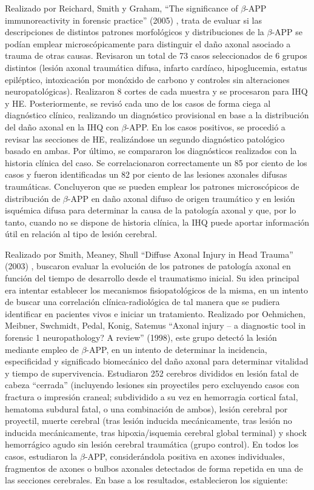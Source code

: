 Realizado por Reichard, Smith y Graham, “The significance of $\beta$-APP immunoreactivity in forensic practice” (2005) \cite{Reichard2005}, trata de evaluar si las descripciones de distintos patrones morfológicos y distribuciones de la $\beta$-APP se podían emplear microscópicamente para distinguir el daño axonal asociado a trauma de otras causas. Revisaron un total de 73 casos seleccionados de 6 grupos distintos (lesión axonal traumática difusa, infarto cardíaco, hipoglucemia, estatus epiléptico, intoxicación por monóxido de carbono y controles sin alteraciones neuropatológicas). Realizaron 8 cortes de cada muestra y se procesaron para IHQ y HE. Posteriormente, se revisó cada uno de los casos de forma ciega al diagnóstico clínico, realizando un diagnóstico provisional en base a la distribución del daño axonal en la IHQ con $\beta$-APP. En los casos positivos, se procedió a revisar las secciones de HE, realizándose un segundo diagnóstico patológico basado en ambas.  Por último, se compararon los diagnósticos realizados con la historia clínica del caso. Se correlacionaron correctamente un 85 por ciento de los casos y fueron identificadas un 82 por ciento de las lesiones axonales difusas traumáticas. Concluyeron que se pueden emplear los patrones microscópicos de distribución de $\beta$-APP en daño axonal difuso de origen traumático y en lesión isquémica difusa para determinar la causa de la patología axonal y que, por lo tanto, cuando no se dispone de historia clínica, la IHQ puede aportar información útil en relación al tipo de lesión cerebral. 

Realizado por Smith, Meaney, Shull “Diffuse Axonal Injury in Head Trauma” (2003) \cite{Smith2003}, buscaron evaluar la evolución de los patrones de patología axonal en función del tiempo de desarrollo desde el traumatismo inicial. Su idea principal era intentar establecer los mecanismos fisiopatológicos de la misma, en un intento de buscar una correlación clínica-radiológica de tal manera que se pudiera identificar en pacientes vivos e iniciar un tratamiento. 
Realizado por Oehmichen, Meibner, Swchmidt, Pedal, Konig, Satemus “Axonal injury – a diagnostic tool in forensic 1 neuropathology? A review” (1998)\cite{Oehmichen1998}, este grupo detectó la lesión mediante empleo de $\beta$-APP, en un intento de determinar la incidencia, especificidad y significado biomecánico del daño axonal para determinar vitalidad y tiempo de supervivencia. Estudiaron 252 cerebros divididos en lesión fatal de cabeza “cerrada” (incluyendo lesiones sin proyectiles pero excluyendo casos con fractura o impresión craneal; subdividido a su vez en hemorragia cortical fatal, hematoma subdural fatal, o una combinación de ambos), lesión cerebral por proyectil, muerte cerebral (tras lesión inducida mecánicamente, tras lesión no inducida mecánicamente, tras hipoxia/isquemia cerebral global terminal) y shock hemorrágico agudo sin lesión cerebral traumática (grupo control). En todos los casos, estudiaron la $\beta$-APP, considerándola positiva en axones individuales, fragmentos de axones o bulbos axonales detectados de forma repetida en una de las secciones cerebrales. En base a los resultados, establecieron los siguiente:

